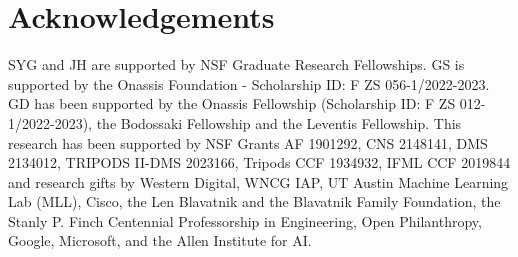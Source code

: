 \documentclass[dvipsnames,11pt]{article}
\makeatletter
\renewcommand\paragraph{\@startsection{paragraph}{4}{\z@}                                     {1.35ex \@plus1ex \@minus.2ex}                                {-.5em}
{\normalfont\normalsize\bfseries}}
\makeatother
\begin{document}








\section*{Acknowledgements}
SYG and JH are supported by NSF Graduate Research Fellowships. GS is supported by the Onassis Foundation - Scholarship ID: F ZS 056-1/2022-2023. GD has been supported by the Onassis Fellowship (Scholarship ID: F ZS 012-1/2022-2023), the Bodossaki Fellowship and the Leventis Fellowship. This research has been supported by NSF Grants AF 1901292, CNS 2148141, DMS 2134012, TRIPODS II-DMS 2023166, Tripods CCF 1934932, IFML CCF 2019844 and research gifts by Western Digital, WNCG IAP, UT Austin Machine Learning Lab (MLL), Cisco, the Len Blavatnik and the Blavatnik Family Foundation, the Stanly P. Finch Centennial Professorship in Engineering, Open Philanthropy, Google, Microsoft, and the Allen Institute for AI. 
\end{document}
